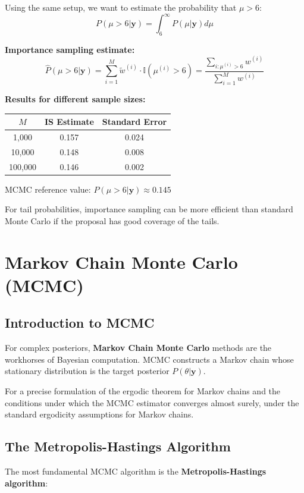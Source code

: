 \begin{examplebox}
\begin{example}
Using the same setup, we want to estimate the probability that $\mu > 6$:
$$P(\mu > 6|\mathbf{y}) = \int_6^\infty P(\mu|\mathbf{y}) d\mu$$

\textbf{Importance sampling estimate:}
$$\hat{P}(\mu > 6|\mathbf{y}) = \sum_{i=1}^M \tilde{w}^{(i)} \cdot \mathbb{I}(\mu^{(i)} > 6) = \frac{\sum_{i: \mu^{(i)} > 6} w^{(i)}}{\sum_{i=1}^M w^{(i)}}$$

\textbf{Results for different sample sizes:}
\begin{center}
\begin{tabular}{ccc}
\toprule
$M$ & IS Estimate & Standard Error \\
\midrule
1,000 & 0.157 & 0.024 \\
10,000 & 0.148 & 0.008 \\
100,000 & 0.146 & 0.002 \\
\bottomrule
\end{tabular}
\end{center}
MCMC reference value: $P(\mu > 6|\mathbf{y}) \approx 0.145$

For tail probabilities, importance sampling can be more efficient than standard Monte Carlo if the proposal has good coverage of the tails.
\end{example}
\end{examplebox}

\section{Markov Chain Monte Carlo (MCMC)}

\subsection{Introduction to MCMC}
For complex posteriors, \textbf{Markov Chain Monte Carlo} methods are the workhorses of Bayesian computation. MCMC constructs a Markov chain whose stationary distribution is the target posterior $P(\theta|\mathbf{y})$.

For a precise formulation of the ergodic theorem for Markov chains and the conditions under which the MCMC estimator converges almost surely, under the standard ergodicity assumptions for Markov chains.

\subsection{The Metropolis-Hastings Algorithm}
The most fundamental MCMC algorithm is the \textbf{Metropolis-Hastings algorithm}:

